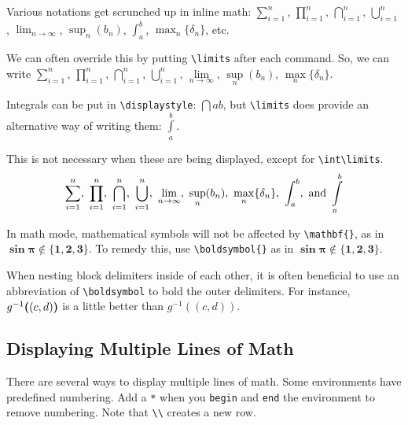 \documentclass{article} 		%
\begin{document}
\begin{notation}
	Various notations get scrunched up in inline math: 
	$\sum_{i=1}^n$, 
	$\prod_{i=1}^n$, 
	$\bigcap_{i=1}^n$, 
	$\bigcup_{i=1}^n$, 
	$\lim_{n \to \infty}$, 
	$\sup_n (b_n)$, 
	$\int_a^b$, 
	$\max_n\{\delta_n\}$, etc. \par
	We can often override this by putting \verb$\limits$
	after each command.
	So, we can write 
	$\sum\limits_{i=1}^n$, 
	$\prod\limits_{i=1}^n$, 
	$\bigcap\limits_{i=1}^n$, 
	$\bigcup\limits_{i=1}^n$, 
	$\lim\limits_{n \to \infty}$,  
	$\sup\limits_n(b_n)$, 
	$\max\limits_n\{\delta_n\}$. \par
	Integrals can be put in \verb$\displaystyle$: $\dint{a}{b}$, but \verb$\limits$ does provide an alternative way of writing them: $\int\limits_a^b$. \par
	This is not necessary when these are being displayed, except for \verb$\int\limits$. 
	\[
		\sum_{i=1}^n,~ 
		\prod_{i=1}^n,~ 
		\bigcap_{i=1}^n,~ 
		\bigcup_{i=1}^n,~
		\lim_{n \to \infty},~
		\sup_n(b_n),~
		\max_n\{\delta_n\},~
		\int_a^b, \text{ and}\ 
		 \int\limits_a^b
	\]
\end{notation}

\begin{notation} \label{notation:bold}
	In math mode, mathematical symbols will not be affected by \verb$\mathbf{}$, as in $\mathbf{\sin\pi \notin \{1, 2, 3\}}$. To remedy this, use \verb$\boldsymbol{}$ as in $\boldsymbol{\sin\pi \notin \{1, 2, 3\}}$. \par
	When nesting block delimiters inside of each other, it is often beneficial to use an abbreviation of \verb$\boldsymbol$ to bold the outer delimiters. For instance, $g^{-1}\boldsymbol((c,d)\boldsymbol)$ is a little better than $g^{-1}((c,d))$. 
\end{notation}

\subsection{Displaying Multiple Lines of Math} \label{subsec:multiple-lines}
There are several ways to display multiple lines of math. Some environments have predefined numbering. Add a \texttt{*} when you \texttt{begin} and \texttt{end} the environment to remove numbering. Note that \verb$\\$ creates a new row. 
\end{document}
